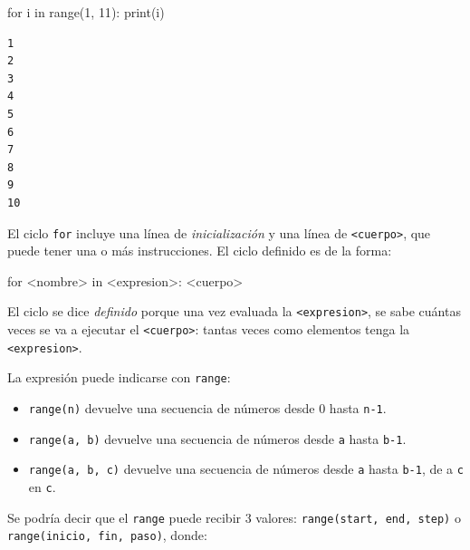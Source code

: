 \documentclass[
  letterpaper,
  DIV=11,
  numbers=noendperiod]{scrreprt}
\newenvironment{Shaded}{\begin{snugshade}}{\end{snugshade}}
\newcommand{\BuiltInTok}[1]{\textcolor[rgb]{0.00,0.23,0.31}{#1}}
\newcommand{\ControlFlowTok}[1]{\textcolor[rgb]{0.00,0.23,0.31}{#1}}
\newcommand{\DecValTok}[1]{\textcolor[rgb]{0.68,0.00,0.00}{#1}}
\newcommand{\KeywordTok}[1]{\textcolor[rgb]{0.00,0.23,0.31}{#1}}
\newcommand{\NormalTok}[1]{\textcolor[rgb]{0.00,0.23,0.31}{#1}}
\newcommand{\OperatorTok}[1]{\textcolor[rgb]{0.37,0.37,0.37}{#1}}
\providecommand{\tightlist}{%
  \setlength{\itemsep}{0pt}\setlength{\parskip}{0pt}}\usepackage{longtable,booktabs,array}
\begin{document}
\begin{Shaded}
\begin{Highlighting}[]
\ControlFlowTok{for}\NormalTok{ i }\KeywordTok{in} \BuiltInTok{range}\NormalTok{(}\DecValTok{1}\NormalTok{, }\DecValTok{11}\NormalTok{):}
    \BuiltInTok{print}\NormalTok{(i)}
\end{Highlighting}
\end{Shaded}

\begin{verbatim}
1
2
3
4
5
6
7
8
9
10
\end{verbatim}

El ciclo \texttt{for} incluye una línea de \emph{inicialización} y una
línea de \texttt{\textless{}cuerpo\textgreater{}}, que puede tener una o
más instrucciones. El ciclo definido es de la forma:

\begin{Shaded}
\begin{Highlighting}[]
\ControlFlowTok{for} \OperatorTok{\textless{}}\NormalTok{nombre}\OperatorTok{\textgreater{}} \KeywordTok{in} \OperatorTok{\textless{}}\NormalTok{expresion}\OperatorTok{\textgreater{}}\NormalTok{:}
    \OperatorTok{\textless{}}\NormalTok{cuerpo}\OperatorTok{\textgreater{}}
\end{Highlighting}
\end{Shaded}

El ciclo se dice \emph{definido} porque una vez evaluada la
\texttt{\textless{}expresion\textgreater{}}, se sabe cuántas veces se va
a ejecutar el \texttt{\textless{}cuerpo\textgreater{}}: tantas veces
como elementos tenga la \texttt{\textless{}expresion\textgreater{}}.

La expresión puede indicarse con \texttt{range}:

\begin{itemize}
\tightlist
\item
  \texttt{range(n)} devuelve una secuencia de números desde 0 hasta
  \texttt{n-1}.
\item
  \texttt{range(a,\ b)} devuelve una secuencia de números desde
  \texttt{a} hasta \texttt{b-1}.
\item
  \texttt{range(a,\ b,\ c)} devuelve una secuencia de números desde
  \texttt{a} hasta \texttt{b-1}, de a \texttt{c} en \texttt{c}.
\end{itemize}

Se podría decir que el \texttt{range} puede recibir 3 valores:
\texttt{range(start,\ end,\ step)} o
\texttt{range(inicio,\ fin,\ paso)}, donde:
\end{document}
